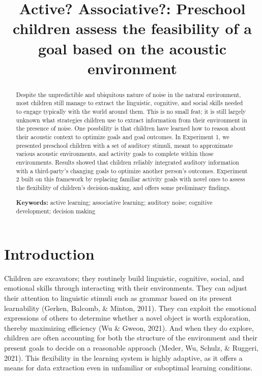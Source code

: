 \documentclass[10pt, letterpaper]{article}
\title{Active? Associative?: Preschool children assess the feasibility
of a goal based on the acoustic environment}
\begin{document}
\maketitle

\begin{abstract}
Despite the unpredictible and ubiquitous nature of noise in the natural
environment, most children still manage to extract the linguistic,
cognitive, and social skills needed to engage typically with the world
around them. This is no small feat; it is still largely unknown what
strategies children use to extract information from their environment in
the presence of noise. One possbility is that children have learned how
to reason about their acoustic context to optimize goals and goal
outcomes. In Experiment 1, we presented preschool children with a set of
auditory stimuli, meant to approximate various acoustic environments,
and activity goals to complete within those environments. Results showed
that children reliably integrated auditory information with a
third-party's changing goals to optimize another person's outcomes.
Experiment 2 built on this framework by replacing familiar activity
goals with novel ones to assess the flexibility of children's
decision-making, and offers some preliminary findings.

\textbf{Keywords:}
active learning; associative learning; auditory noise; cognitive
development; decision making
\end{abstract}

\hypertarget{introduction}{%
\section{Introduction}\label{introduction}}

Children are excavators; they routinely build linguistic, cognitive,
social, and emotional skills through interacting with their
environments. They can adjust their attention to linguistic stimuli such
as grammar based on its present learnability (Gerken, Balcomb, \&
Minton, 2011). They can exploit the emotional expressions of others to
determine whether a novel object is worth exploration, thereby
maximizing efficiency (Wu \& Gweon, 2021). And when they do explore,
children are often accounting for both the structure of the environment
and their present goals to decide on a reasonable approach (Meder, Wu,
Schulz, \& Ruggeri, 2021). This flexibility in the learning system is
highly adaptive, as it offers a means for data extraction even in
unfamiliar or suboptimal learning conditions.
\end{document}
